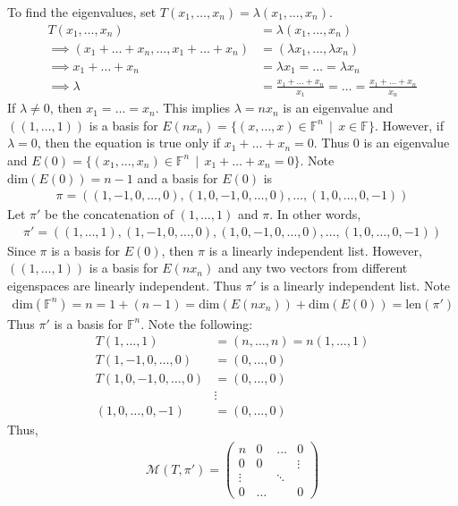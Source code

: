 \documentclass[12pt]{article}
\newcommand{\suchthat}{\, \mid \,}
\begin{document}
	\noindent To find the eigenvalues, set $T(x_1, \dots, x_n) = \lambda(x_1, \dots, x_n)$.
	\begin{align*}
		T(x_1, \dots, x_n) &= \lambda(x_1, \dots, x_n) \\
		\implies (x_1 + \dots + x_n, \dots, x_1 + \dots + x_n) &= (\lambda x_1, \dots, \lambda x_n) \\
		\implies x_1 + \dots + x_n &= \lambda x_1 = \dots = \lambda x_n\\
		\implies \lambda &= \frac{x_1 + \dots + x_n}{x_1} = \dots = \frac{x_1 + \dots + x_n}{x_n}
	\end{align*}
	If $\lambda \neq 0$, then $x_1 = \dots = x_n$.  This implies $\lambda = n x_n$ is an eigenvalue and $((1, \dots, 1))$ is a basis for $E(n x_n) = \{(x, \dots, x) \in \mathbb{F}^n \suchthat x \in \mathbb{F}\}$.  However, if $\lambda = 0$, then the equation is true only if $x_1 + \dots + x_n = 0$.  Thus $0$ is an eigenvalue and $E(0) = \{(x_1, \dots, x_n) \in \mathbb{F}^n \suchthat x_1 + \dots + x_n = 0\}$.  Note $\text{dim}(E(0)) = n-1$ and a basis for $E(0)$ is
	\begin{align*}
		\pi = ((1, -1, 0, \dots, 0), (1, 0, -1, 0, \dots, 0), \dots, (1, 0, \dots, 0, -1))
	\end{align*}
	Let $\pi'$ be the concatenation of $(1, \dots, 1)$ and $\pi$.  In other words,
	\begin{align*}
		\pi' = ((1, \dots, 1),(1, -1, 0, \dots, 0), (1, 0, -1, 0, \dots, 0), \dots, (1, 0, \dots, 0, -1))
	\end{align*}
	Since $\pi$ is a basis for $E(0)$, then $\pi$ is a linearly independent list.  However, $((1, \dots, 1))$ is a basis for $E(n x_n)$ and any two vectors from different eigenspaces are linearly independent.  Thus $\pi'$ is a linearly independent list.  Note
	\begin{align*}
		\text{dim}(\mathbb{F}^n) = n = 1 + (n-1) = \text{dim}(E(n x_n)) + \text{dim}(E(0)) = \text{len}(\pi')
	\end{align*}
	Thus $\pi'$ is a basis for $\mathbb{F}^n$.  Note the following:
	\begin{align*}
		T(1, \dots, 1) &= (n, \dots, n) = n(1, \dots, 1)\\
		T(1, -1, 0, \dots, 0) &= (0, \dots, 0) \\
		T(1, 0, -1, 0, \dots, 0) &= (0, \dots, 0) \\
		&\vdots \\
		(1, 0, \dots, 0, -1) &= (0, \dots, 0)
	\end{align*}
	Thus,
	\begin{align*}
		\mathcal{M}(T, \pi') = \left(\begin{array}{cccc}
			n & 0 & \dots & 0 \\
			0 & 0 & & \vdots \\
			\vdots & & \ddots & \\
			0 & \dots & & 0
			\end{array}\right)
	\end{align*}
\end{document}
